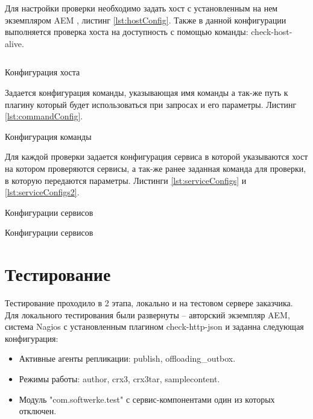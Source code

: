 Для настройки проверки необходимо задать хост с установленным на нем экземпляром AEM \cite{web:nagiosOverflow}, листинг \ref{lst:hostConfig}. Также в данной конфигурации выполняется проверка хоста на доступность с помощью команды: check-host-alive.

\begin{listing}[H]
\inputminted[linenos,frame=single,fontsize=\footnotesize]{bash}{inc/src/hostConfig}
\caption{Конфигурация хоста} 
\label{lst:hostConfig}
\end{listing}

Задается конфигурация команды, указывающая  имя команды а так-же путь к плагину который будет использоваться при запросах и его параметры. Листинг \ref{lst:commandConfig}.

\begin{listing}[H]
\caption{Конфигурация команды} 
\label{lst:commandConfig}
\end{listing}

Для каждой проверки задается конфигурация сервиса в которой указываются хост на котором проверяются сервисы, а так-же ранее заданная команда для проверки, в которую передаются параметры. Листинги \ref{lst:serviceConfigs} и \ref{lst:serviceConfigs2}. 

\begin{listing}[H]
\caption{Конфигурации сервисов}
\label{lst:serviceConfigs} 
\end{listing}

\begin{listing}[H]
\caption{Конфигурации сервисов}
\label{lst:serviceConfigs2} 
\end{listing}


\section{Тестирование}

Тестирование проходило в 2 этапа, локально и на тестовом сервере заказчика.
Для локального тестирования были развернуты – авторский экземпляр AEM, система Nagios \cite{web:nagiosInstall} с установленным плагином check-http-json и заданна следующая конфигурация:
\begin{itemize}
\item Активные агенты репликации: publish, offloading\_outbox.
\item Режимы работы: author, crx3, crx3tar, samplecontent.
\item Модуль "com.softwerke.test" с сервис-компонентами один из которых отключен.
\end{itemize}

